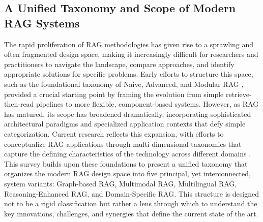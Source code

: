 \documentclass[11pt]{article}
\begin{document}
\subsection{A Unified Taxonomy and Scope of Modern RAG Systems}

The rapid proliferation of RAG methodologies has given rise to a sprawling and often fragmented design space, making it increasingly difficult for researchers and practitioners to navigate the landscape, compare approaches, and identify appropriate solutions for specific problems. Early efforts to structure this space, such as the foundational taxonomy of Naive, Advanced, and Modular RAG \cite{ref1}, provided a crucial starting point by framing the evolution from simple retrieve-then-read pipelines to more flexible, component-based systems. However, as RAG has matured, its scope has broadened dramatically, incorporating sophisticated architectural paradigms and specialized application contexts that defy simple categorization. Current research reflects this expansion, with efforts to conceptualize RAG applications through multi-dimensional taxonomies that capture the defining characteristics of the technology across different domains \cite{ref32}. This survey builds upon these foundations to present a unified taxonomy that organizes the modern RAG design space into five principal, yet interconnected, system variants: Graph-based RAG, Multimodal RAG, Multilingual RAG, Reasoning-Enhanced RAG, and Domain-Specific RAG. This structure is designed not to be a rigid classification but rather a lens through which to understand the key innovations, challenges, and synergies that define the current state of the art.
\end{document}

